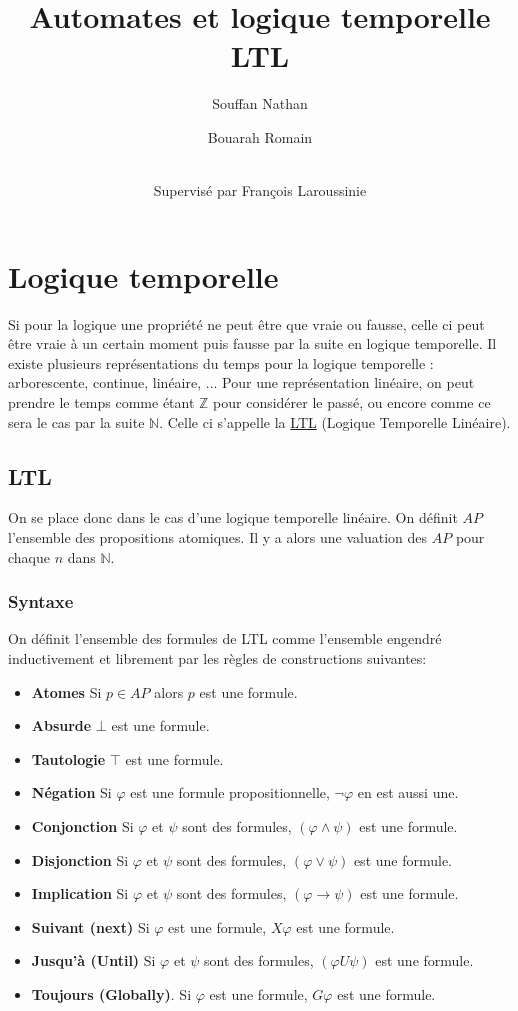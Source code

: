 \documentclass[12pt,a4paper]{article}
\title {Automates et logique temporelle LTL}
\author{
  Souffan Nathan \and
  Bouarah Romain \and
  \\Supervisé par François Laroussinie
}
\theoremstyle{plain}
\theoremstyle{definition}
\begin{document}
\maketitle
\newpage

\section{Logique temporelle}

Si pour la logique une propriété ne peut être que vraie ou fausse, celle ci peut être vraie à un certain moment puis fausse par la suite en logique temporelle.
Il existe plusieurs représentations du temps pour la logique temporelle : arborescente, continue, linéaire, ...
Pour une représentation linéaire, on peut prendre le temps comme étant $\mathbb{Z}$ pour considérer le passé, ou encore comme ce sera le cas par la suite $\mathbb{N}$.
Celle ci s'appelle la \underline{LTL} (Logique Temporelle Linéaire).

\subsection{LTL}
On se place donc dans le cas d'une logique temporelle linéaire.
On définit $AP$ l'ensemble des propositions atomiques. Il y a alors une valuation des $AP$ pour chaque $n$ dans $\mathbb{N}$.

\subsubsection{Syntaxe}
On définit l'ensemble des formules de LTL comme l'ensemble engendré inductivement et librement par les règles de constructions suivantes:
\begin{itemize}
	\item[] \textbf{Atomes} Si $p \in AP$ alors $p$ est une formule.
	\item[] \textbf{Absurde} $\bot$ est une formule.
	\item[] \textbf{Tautologie} $\top$ est une formule.
	\item[] \textbf{Négation} Si $\varphi$ est une formule propositionnelle, $\lnot \varphi$ en est aussi une.
	\item[] \textbf{Conjonction} Si $\varphi$ et $\psi$ sont des formules, $(\varphi\land \psi)$ est une formule.
	\item[] \textbf{Disjonction} Si $\varphi$ et $\psi$ sont des formules, $(\varphi\lor \psi)$ est une formule.
	\item[] \textbf{Implication} Si $\varphi$ et $\psi$ sont des formules, $(\varphi \to \psi)$ est une formule.
	\item[] \textbf{Suivant (next)} Si $\varphi$ est une formule, $X\varphi$ est une formule.
	\item[] \textbf{Jusqu'à (Until)} Si $\varphi$ et $\psi$ sont des formules, $(\varphi U \psi)$ est une formule.
	\item[] \textbf{Toujours (Globally)}. Si $\varphi$ est une formule, $G\varphi$ est une formule.
\end{itemize}
\end{document}

